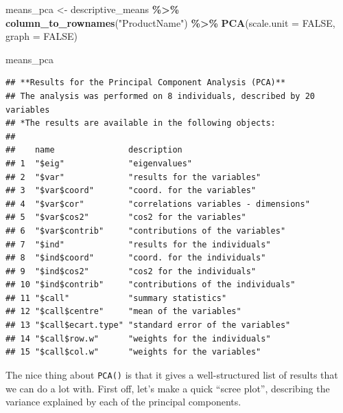 \documentclass[
]{book}
\newenvironment{Shaded}{\begin{snugshade}}{\end{snugshade}}
\newcommand{\AttributeTok}[1]{\textcolor[rgb]{0.13,0.29,0.53}{#1}}
\newcommand{\CommentTok}[1]{\textcolor[rgb]{0.56,0.35,0.01}{\textit{#1}}}
\newcommand{\ConstantTok}[1]{\textcolor[rgb]{0.56,0.35,0.01}{#1}}
\newcommand{\FunctionTok}[1]{\textcolor[rgb]{0.13,0.29,0.53}{\textbf{#1}}}
\newcommand{\NormalTok}[1]{#1}
\newcommand{\OtherTok}[1]{\textcolor[rgb]{0.56,0.35,0.01}{#1}}
\newcommand{\SpecialCharTok}[1]{\textcolor[rgb]{0.81,0.36,0.00}{\textbf{#1}}}
\newcommand{\StringTok}[1]{\textcolor[rgb]{0.31,0.60,0.02}{#1}}
\begin{document}
\begin{Shaded}
\begin{Highlighting}[]
\NormalTok{means\_pca }\OtherTok{\textless{}{-}} 
\NormalTok{  descriptive\_means }\SpecialCharTok{\%\textgreater{}\%}
  \FunctionTok{column\_to\_rownames}\NormalTok{(}\StringTok{"ProductName"}\NormalTok{) }\SpecialCharTok{\%\textgreater{}\%}
  \FunctionTok{PCA}\NormalTok{(}\AttributeTok{scale.unit =} \ConstantTok{FALSE}\NormalTok{, }\AttributeTok{graph =} \ConstantTok{FALSE}\NormalTok{)}

\NormalTok{means\_pca}
\end{Highlighting}
\end{Shaded}

\begin{verbatim}
## **Results for the Principal Component Analysis (PCA)**
## The analysis was performed on 8 individuals, described by 20 variables
## *The results are available in the following objects:
## 
##    name               description                          
## 1  "$eig"             "eigenvalues"                        
## 2  "$var"             "results for the variables"          
## 3  "$var$coord"       "coord. for the variables"           
## 4  "$var$cor"         "correlations variables - dimensions"
## 5  "$var$cos2"        "cos2 for the variables"             
## 6  "$var$contrib"     "contributions of the variables"     
## 7  "$ind"             "results for the individuals"        
## 8  "$ind$coord"       "coord. for the individuals"         
## 9  "$ind$cos2"        "cos2 for the individuals"           
## 10 "$ind$contrib"     "contributions of the individuals"   
## 11 "$call"            "summary statistics"                 
## 12 "$call$centre"     "mean of the variables"              
## 13 "$call$ecart.type" "standard error of the variables"    
## 14 "$call$row.w"      "weights for the individuals"        
## 15 "$call$col.w"      "weights for the variables"
\end{verbatim}

The nice thing about \texttt{PCA()} is that it gives a well-structured list of results that we can do a lot with. First off, let's make a quick ``scree plot'', describing the variance explained by each of the principal components.

\begin{Shaded}
\end{Shaded}
\end{document}
